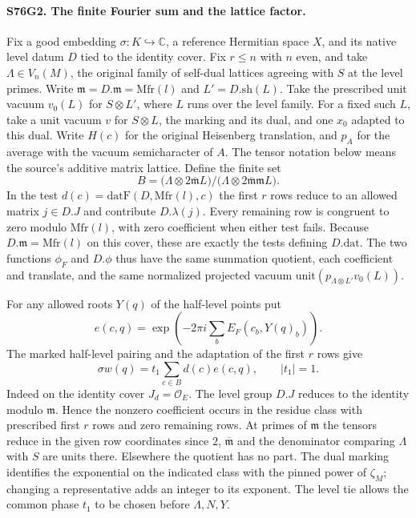 \paragraph{S76G2. The finite Fourier sum and the lattice factor.}
Fix a good embedding $\sigma:K\hookrightarrow\mathbb C$, a reference
Hermitian space $X$, and its native level datum $D$ tied to the
identity cover. Fix $r\leq n$ with $n$ even, and take $\Lambda\in V_{n}(M)$, the original family of
self-dual lattices agreeing with $S$ at the level primes. Write
$\mathfrak m=D.\mathfrak m=\mathrm{Mfr}(l)$ and $L'=D.\mathrm{sh}(L)$.
Take the prescribed unit vacuum $v_0(L)$ for $S\otimes L'$,
where $L$ runs over the level family. For a fixed such $L$, take a
unit vacuum $v$ for $S\otimes L$, the marking and its dual, and
one $x_0$ adapted to this dual. Write $H(c)$ for the original
Heisenberg translation, and $p_A$ for the average with the vacuum
semicharacter of $A$. The tensor notation below means the source's
additive matrix lattice. Define the finite set
\[
 B=\big(\Lambda\otimes 2\overline{\mathfrak m}L\big)/
     \big(\Lambda\otimes 2\overline{\mathfrak m}\mathfrak m L\big).
\]
In the test $d(c)=\mathrm{datF}(D,\mathrm{Mfr}(l),c)$ the first
$r$ rows reduce to an allowed matrix $j\in D.J$ and contribute
$D.\lambda(j)$. Every remaining row is congruent to zero modulo
$\mathrm{Mfr}(l)$, with zero coefficient when either test fails.
Because $D.\mathfrak m=\mathrm{Mfr}(l)$ on this cover, these are
exactly the tests defining $D.\mathrm{dat}$. The two functions
$\phi_F$ and $D.\phi$ thus have the same summation quotient, each
coefficient and translate, and the same normalized projected vacuum
$\mathrm{unit}(p_{\Lambda\otimes L'}v_0(L))$.

For any allowed roots $Y(q)$ of the half-level points put
\[
 e(c,q)=\exp\!\left(-2\pi i\sum_b E_F(c_b,Y(q)_b)\right).
\]
The marked
half-level pairing and the adaptation of the first $r$ rows give
\[
   \sigma w(q)=t_1\sum_{c\in B}d(c)e(c,q),\qquad |t_1|=1 .
\]
Indeed on the identity cover $J_d=\mathcal O_E$. The level group
$D.J$ reduces to the identity modulo $\mathfrak m$. Hence the
nonzero coefficient occurs in the residue class with prescribed
first $r$ rows and zero remaining rows. At primes of $\mathfrak m$
the tensors reduce in the given row coordinates since $2$,
$\overline{\mathfrak m}$ and the denominator comparing $\Lambda$
with $S$ are units there. Elsewhere the quotient has no part.
The dual marking identifies the exponential on the indicated class
with the pinned power of $\zeta_M$; changing a representative adds
an integer to its exponent. The level tie allows the common phase
$t_1$ to be chosen before $\Lambda,N,Y$.

